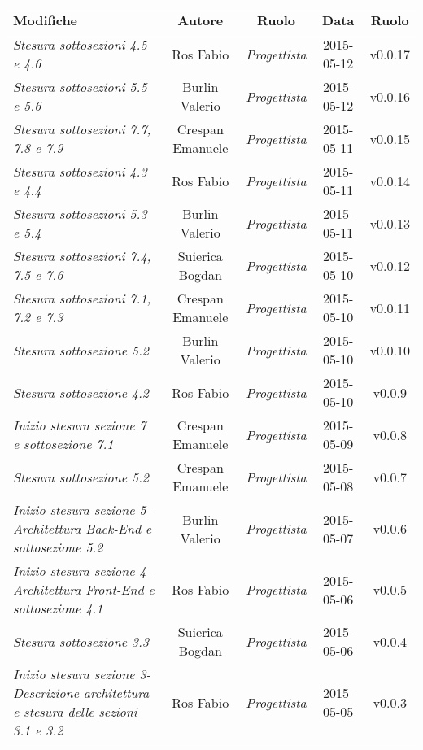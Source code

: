 \begin{table}[h]
\centering
\begin{tabular}{|p{}|c|c|c|c|}
	\toprule
	\textbf{Modifiche} & \textbf{Autore} & \textbf{Ruolo} & \textbf{Data} & \textbf{Ruolo} \\
	\midrule
	\midrule
	\textit{Stesura sottosezioni 4.5 e 4.6} & Ros Fabio & \textit{Progettista} & 2015-05-12 & v0.0.17 \\
	\midrule
		\textit{Stesura sottosezioni 5.5 e 5.6} & Burlin Valerio & \textit{Progettista} & 2015-05-12 & v0.0.16 \\
	\midrule
		\textit{Stesura sottosezioni 7.7, 7.8 e 7.9} & Crespan Emanuele & \textit{Progettista} & 2015-05-11 & v0.0.15 \\
	\midrule
		\textit{Stesura sottosezioni 4.3 e 4.4} & Ros Fabio & \textit{Progettista} & 2015-05-11 & v0.0.14 \\
	\midrule
		\textit{Stesura sottosezioni 5.3 e 5.4} & Burlin Valerio & \textit{Progettista} & 2015-05-11 & v0.0.13 \\
	\midrule
		\textit{Stesura sottosezioni 7.4, 7.5 e 7.6} & Suierica Bogdan & \textit{Progettista} & 2015-05-10 & v0.0.12 \\					
	\midrule
		\textit{Stesura sottosezioni 7.1, 7.2 e 7.3} & Crespan Emanuele & \textit{Progettista} & 2015-05-10 & v0.0.11 \\
	\midrule
		\textit{Stesura sottosezione 5.2} & Burlin Valerio & \textit{Progettista} & 2015-05-10 & v0.0.10 \\
	\midrule
		\textit{Stesura sottosezione 4.2} & Ros Fabio & \textit{Progettista} & 2015-05-10 & v0.0.9 \\
	\midrule
		\textit{Inizio stesura sezione 7 e sottosezione 7.1} & Crespan Emanuele & \textit{Progettista} & 2015-05-09 & v0.0.8 \\
	\midrule
		\textit{Stesura sottosezione 5.2} & Crespan Emanuele & \textit{Progettista} & 2015-05-08 & v0.0.7 \\
	\midrule
		\textit{Inizio stesura sezione 5-Architettura Back-End e sottosezione 5.2} & Burlin Valerio & \textit{Progettista} & 2015-05-07 & v0.0.6 \\
	\midrule
		\textit{Inizio stesura sezione 4-Architettura Front-End e sottosezione 4.1} & Ros Fabio & \textit{Progettista} & 2015-05-06 & v0.0.5 \\
	\midrule
		\textit{Stesura sottosezione 3.3} & Suierica Bogdan & \textit{Progettista} & 2015-05-06 & v0.0.4 \\
	\midrule
		\textit{Inizio stesura sezione 3-Descrizione architettura e stesura delle sezioni 3.1 e 3.2} & Ros Fabio & \textit{Progettista} & 2015-05-05 & v0.0.3 \\
	\bottomrule
\end{tabular}	
\end{table}

